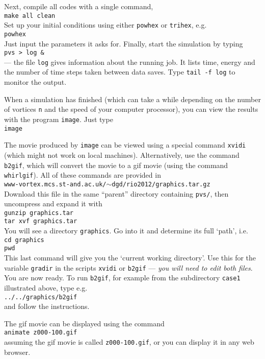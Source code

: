 \documentclass[12pt]{article}
\begin{document}
\medskip
Next, compile all codes with a single command,\\[2mm]
{\tt make all clean}\\[2mm]
Set up your initial conditions using either {\tt powhex} or {\tt trihex}, 
e.g.\\[2mm]
{\tt powhex}\\[2mm]
Just input the parameters it asks for.  Finally, start the simulation
by typing\\[2mm]
{\tt pvs > log \&}\\[2mm]
--- the file {\tt log} gives information about the running job.  It
lists time, energy and the number of time steps taken between data saves.
Type {\tt tail -f log} to monitor the output.

\medskip
When a simulation has finished (which can take a while depending on the
number of vortices {\tt n} and the speed of your computer processor), 
you can view the results with the program {\tt image}.  Just type\\[2mm]
{\tt image}

\medskip
The movie produced by {\tt image} can be viewed using a special command
{\tt xvidi} (which might not work on local machines).  Alternatively,
use the command {\tt b2gif}, which will convert the movie to a gif
movie (using the command {\tt whirlgif}).  All of these commands are
provided in \\[2mm]
{\tt www-vortex.mcs.st-and.ac.uk/$\sim$dgd/rio2012/graphics.tar.gz} \\[2mm]
Download this file in the same ``parent''
directory containing {\tt pvs/}, then uncompress and expand it with \\[2mm]
{\tt gunzip graphics.tar}\\
{\tt tar xvf graphics.tar}\\[2mm]
You will see a directory {\tt graphics}.  Go into it 
and determine its full `path', i.e.\\[2mm]
{\tt cd graphics}\\
{\tt pwd}\\[2mm]
This last command will give you the `current working directory'.
Use this for the variable {\tt gradir} in the scripts 
{\tt xvidi} or {\tt b2gif} --- {\it you will need to edit both files}.
You are now ready.  To run {\tt b2gif},
for example from the subdirectory {\tt case1} illustrated above, 
type e.g.\\[2mm]
{\tt ../../graphics/b2gif} \\[2mm]
and follow the instructions.

\medskip
The gif movie can be displayed using the command\\[2mm]
{\tt animate z000-100.gif}\\[2mm]
assuming the gif movie is called {\tt z000-100.gif}, or you
can display it in any web browser.
\end{document}

